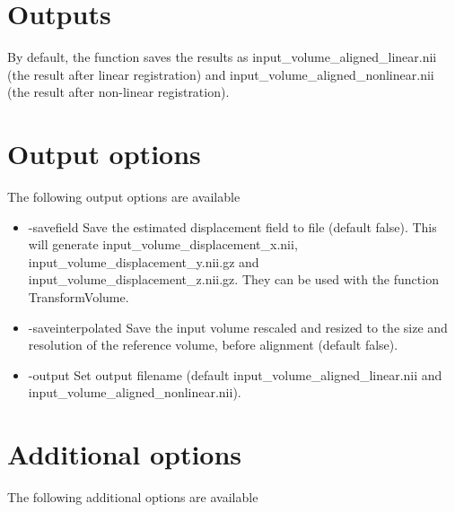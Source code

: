 \section{Outputs}

By default, the function saves the results as input\_volume\_aligned\_linear.nii (the result after linear registration) and input\_volume\_aligned\_nonlinear.nii (the result after non-linear registration). 

\newpage 

\section{Output options}

The following output options are available

\begin{itemize}

\item -savefield                 
\newline \newline Save the estimated displacement field to file (default false). This will generate input\_volume\_displacement\_x.nii, input\_volume\_displacement\_y.nii.gz and input\_volume\_displacement\_z.nii.gz. They can be used with the function TransformVolume.

\item -saveinterpolated          
\newline \newline Save the input volume rescaled and resized to the size and resolution of the reference volume, before alignment (default false). 

\item -output 
\newline \newline Set output filename (default input\_volume\_aligned\_linear.nii and input\_volume\_aligned\_nonlinear.nii). 

\end{itemize}

\section{Additional options}

The following additional options are available

